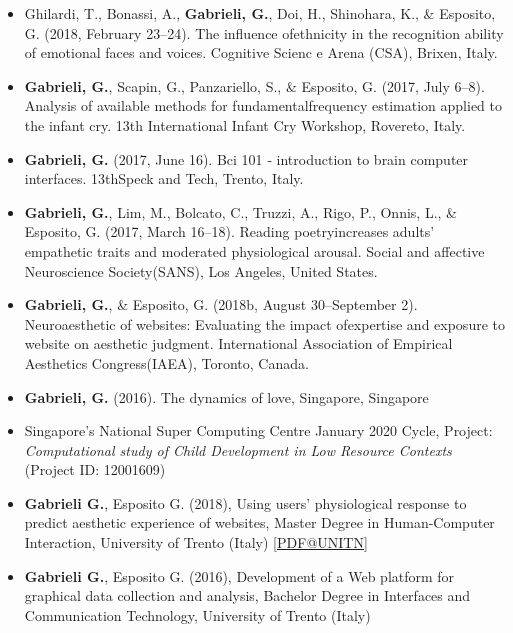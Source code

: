 \documentclass[10pt,a4paper]{altacv}
\begin{document}
\begin{fullwidth}
\begin{itemize}
 \item Ghilardi, T., Bonassi, A., \textbf{Gabrieli, G.}, Doi, H., Shinohara, K., \& Esposito, G. (2018, February 23–24). The influence ofethnicity in the recognition ability of emotional faces and voices. Cognitive Scienc e Arena (CSA), Brixen, Italy.
 \item  \textbf{Gabrieli, G.}, Scapin, G., Panzariello, S., \& Esposito, G. (2017, July 6–8). Analysis of available methods for fundamentalfrequency estimation applied to the infant cry. 13th International Infant Cry Workshop, Rovereto, Italy.
 \item  \textbf{Gabrieli, G.} (2017, June 16). Bci 101 ‐ introduction to brain computer interfaces. 13thSpeck and Tech, Trento, Italy.
 \item  \textbf{Gabrieli, G.}, Lim, M., Bolcato, C., Truzzi, A., Rigo, P., Onnis, L., \& Esposito, G. (2017, March 16–18). Reading poetryincreases adults’ empathetic traits and moderated physiological arousal. Social and affective Neuroscience Society(SANS), Los Angeles, United States.
 \item  \textbf{Gabrieli, G.}, \& Esposito, G. (2018b, August 30–September 2). Neuroaesthetic of websites: Evaluating the impact ofexpertise and exposure to website on aesthetic judgment. International Association of Empirical Aesthetics Congress(IAEA), Toronto, Canada.
 \item  \textbf{Gabrieli, G.} (2016). The dynamics of love, Singapore, Singapore
\end{itemize}
	
		
		\begin{itemize}
			\item Singapore's National Super Computing Centre January 2020 Cycle, Project: \textit{Computational study of Child Development in Low Resource Contexts} (Project ID: 12001609)
		\end{itemize}
		
		\begin{itemize}
			\item \textbf{Gabrieli G.}, Esposito G. (2018), Using users' physiological response to predict aesthetic experience of websites, Master Degree in Human-Computer Interaction, University of Trento (Italy) [\href{http://www5.unitn.it/Biblioteca/it/Web/RichiestaConsultazioneTesi/364090}{PDF@UNITN}]
			
			\item \textbf{Gabrieli G.}, Esposito G. (2016), Development of a Web platform for graphical data collection and analysis, Bachelor Degree in Interfaces and Communication Technology, University of Trento (Italy) 
		\end{itemize}
		

\end{fullwidth}
\end{document}
